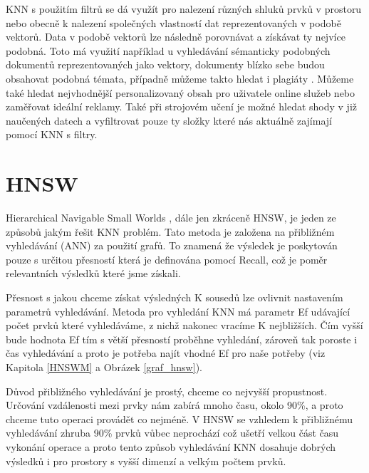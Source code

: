 \documentclass[czech,semestral,dept460,male,csharp,cpdeclaration]{diploma}
\begin{document}
		KNN s použitím filtrů se dá využít pro nalezení různých shluků prvků v prostoru nebo obecně k nalezení společných vlastností dat reprezentovaných v podobě vektorů. Data v podobě vektorů lze následně porovnávat a získávat ty nejvíce podobná. Toto má využití například u vyhledávání sémanticky podobných dokumentů reprezentovaných jako vektory, dokumenty blízko sebe budou obsahovat podobná témata, případně můžeme takto hledat i plagiáty \cite{KNN-Real-World}. Můžeme také hledat nejvhodnější personalizovaný obsah pro uživatele online služeb nebo zaměřovat ideální reklamy. Také při strojovém učení je možné hledat shody v již naučených datech a vyfiltrovat pouze ty složky které nás aktuálně zajímají pomocí KNN s filtry.
	
	\chapter{HNSW}
	\label{chap_hnsw}
	
		Hierarchical Navigable Small Worlds \cite{malkov2018efficient}, dále jen zkráceně HNSW, je jeden ze způsobů jakým řešit KNN problém. Tato metoda je založena na přibližném vyhledávání (ANN) za použití grafů. To znamená že výsledek je poskytován pouze s určitou přesností která je definována pomocí Recall, což je poměr relevantních výsledků které jsme získali.
		
		Přesnost s jakou chceme získat výsledných K sousedů lze ovlivnit nastavením parametrů vyhledávání. Metoda pro vyhledání KNN má parametr Ef udávající počet prvků které vyhledáváme, z nichž nakonec vracíme K nejbližších. Čím vyšší bude hodnota Ef tím s větší přesností proběhne vyhledání, zároveň tak poroste i čas vyhledávání a proto je potřeba najít vhodné Ef pro naše potřeby (viz Kapitola \ref{HNSWM} a Obrázek \ref{graf_hnsw}).
		
		Důvod přibližného vyhledávání je prostý, chceme co nejvyšší propustnost. Určování vzdálenosti mezi prvky nám zabírá mnoho času, okolo 90\%, a proto chceme tuto operaci provádět co nejméně. V HNSW se vzhledem k přibližnému vyhledávání zhruba 90\% prvků vůbec neprochází což ušetří velkou část času vykonání operace a proto tento způsob vyhledávání KNN dosahuje dobrých výsledků i pro prostory s vyšší dimenzí a velkým počtem prvků.
		
\end{document}
